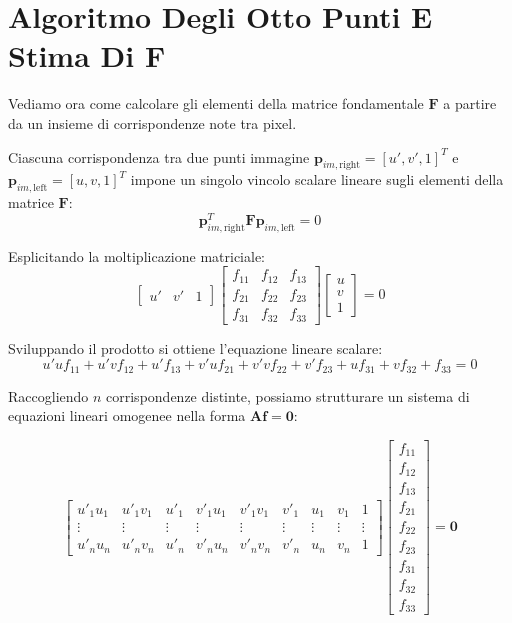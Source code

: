 ﻿\documentclass[11pt, a4paper]{article}
\begin{document}
\newpage

\section{Algoritmo Degli Otto Punti E Stima Di F}

Vediamo ora come calcolare gli elementi della matrice fondamentale $\bm{F}$ a partire da un insieme di corrispondenze note tra pixel.

Ciascuna corrispondenza tra due punti immagine $\bm{p}_{im,\text{right}} = [u', v', 1]^T$ e $\bm{p}_{im,\text{left}} = [u, v, 1]^T$ impone un singolo vincolo scalare lineare sugli elementi della matrice $\bm{F}$:
\begin{equation}
\bm{p}_{im,\text{right}}^T \bm{F} \bm{p}_{im,\text{left}} = 0
\end{equation}

Esplicitando la moltiplicazione matriciale:
\[
\begin{bmatrix} u' & v' & 1 \end{bmatrix} \begin{bmatrix} f_{11} & f_{12} & f_{13} \\ f_{21} & f_{22} & f_{23} \\ f_{31} & f_{32} & f_{33} \end{bmatrix} \begin{bmatrix} u \\ v \\ 1 \end{bmatrix} = 0
\]

Sviluppando il prodotto si ottiene l'equazione lineare scalare:
\begin{equation}
u'u f_{11} + u'v f_{12} + u' f_{13} + v'u f_{21} + v'v f_{22} + v' f_{23} + u f_{31} + v f_{32} + f_{33} = 0
\end{equation}

Raccogliendo $n$ corrispondenze distinte, possiamo strutturare un sistema di equazioni lineari omogenee nella forma $\bm{A}\bm{f} = \bm{0}$:

\begin{equation}
\begin{bmatrix} u'_1 u_1 & u'_1 v_1 & u'_1 & v'_1 u_1 & v'_1 v_1 & v'_1 & u_1 & v_1 & 1 \\ \vdots & \vdots & \vdots & \vdots & \vdots & \vdots & \vdots & \vdots & \vdots \\ u'_n u_n & u'_n v_n & u'_n & v'_n u_n & v'_n v_n & v'_n & u_n & v_n & 1 \end{bmatrix} \begin{bmatrix} f_{11} \\ f_{12} \\ f_{13} \\ f_{21} \\ f_{22} \\ f_{23} \\ f_{31} \\ f_{32} \\ f_{33} \end{bmatrix} = \bm{0}
\end{equation}
\end{document}

